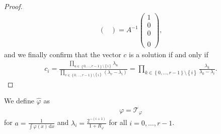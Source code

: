 \begin{proof}
\begin{align*}
\begin{pmatrix}
        \end{pmatrix}
        = A^{-1}\begin{pmatrix}
            1 \\ 0 \\ 0 \\ \\ 0
        \end{pmatrix},
    \end{align*}
    and we finally confirm that the vector \(c\) is a solution if and only if  
    \begin{align*}
        c_i = \frac{\prod\limits_{u \in \left\{ 0, \ldots, r-1 \right\} \setminus \left\{ i \right\} }\lambda_u}{\prod\limits_{v \in \left\{ 0, \ldots, r-1 \right\} \setminus \left\{ i \right\}} (\lambda_v - \lambda_i)} = \prod\limits_{k \in \left\{ 0, \ldots , r-1 \right\} \setminus \left\{ i \right\}} \frac{\lambda_k}{\lambda_k - \lambda_i}.
    \end{align*}
\end{proof}

We define \(\hat \varphi\) as
\begin{align}\label{definition:tweakedvarphi}
    \varphi = \mathcal{T}_{\varphi}
\end{align}
for \(a = \frac{1}{\int \varphi(x) \, \mathrm{d}x}\) and \(\lambda_i = \frac{2^{-(i+1)}}{1+R_\varphi}\) for all \(i = 0,\ldots,r-1\).   
    
